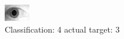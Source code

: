 \begin{figure}[h!]
\begin{center}
\includegraphics[width=0.60\columnwidth]{figures/ID1935_class_4_target_3.png}
\end{center}
\caption{ Classification: 4 actual target: 3}
\label{fig:ID1935_class_4_target_3}
\end{figure}
